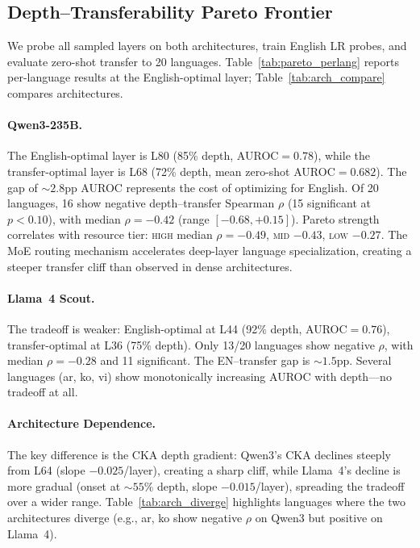 \documentclass[11pt,a4paper]{article}
\newcommand{\auroc}{AUROC}
\begin{document}
\subsection{Depth--Transferability Pareto Frontier}
\label{sec:pareto}

We probe all sampled layers on both architectures, train English LR probes, and evaluate zero-shot transfer to 20 languages. Table~\ref{tab:pareto_perlang} reports per-language results at the English-optimal layer; Table~\ref{tab:arch_compare} compares architectures.

\paragraph{Qwen3-235B.} The English-optimal layer is L80 (85\% depth, \auroc{}$=0.78$), while the transfer-optimal layer is L68 (72\% depth, mean zero-shot \auroc{}$=0.682$). The gap of ${\sim}2.8$pp \auroc{} represents the cost of optimizing for English. Of 20 languages, 16 show negative depth--transfer Spearman $\rho$ (15 significant at $p<0.10$), with median $\rho=-0.42$ (range $[-0.68, +0.15]$). Pareto strength correlates with resource tier: \textsc{high} median $\rho=-0.49$, \textsc{mid} $-0.43$, \textsc{low} $-0.27$. The MoE routing mechanism accelerates deep-layer language specialization, creating a steeper transfer cliff than observed in dense architectures.

\paragraph{Llama~4 Scout.} The tradeoff is weaker: English-optimal at L44 (92\% depth, \auroc{}$=0.76$), transfer-optimal at L36 (75\% depth). Only 13/20 languages show negative $\rho$, with median $\rho=-0.28$ and 11 significant. The EN--transfer gap is ${\sim}1.5$pp. Several languages (ar, ko, vi) show monotonically increasing \auroc{} with depth---no tradeoff at all.

\paragraph{Architecture Dependence.}
The key difference is the CKA depth gradient: Qwen3's CKA declines steeply from L64 (slope $-0.025$/layer), creating a sharp cliff, while Llama~4's decline is more gradual (onset at ${\sim}55\%$ depth, slope $-0.015$/layer), spreading the tradeoff over a wider range. Table~\ref{tab:arch_diverge} highlights languages where the two architectures diverge (e.g., ar, ko show negative $\rho$ on Qwen3 but positive on Llama~4).
\end{document}

